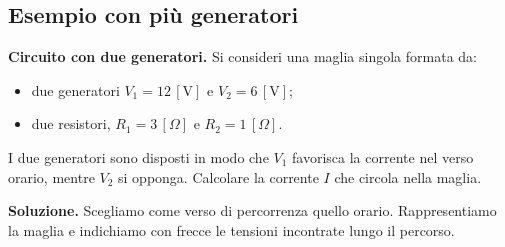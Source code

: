 \subsection{Esempio con più generatori}

\begin{esempio}
\textbf{Circuito con due generatori.} Si consideri una maglia singola formata da:
\begin{itemize}[leftmargin=1cm]
  \item due generatori \(V_1 = 12\,[\text{V}]\) e \(V_2 = 6\,[\text{V}]\);
  \item due resistori, \(R_1 = 3\,[\Omega]\) e \(R_2 = 1\,[\Omega]\).
\end{itemize}
I due generatori sono disposti in modo che \(V_1\) favorisca la corrente nel verso orario, mentre \(V_2\) si opponga. Calcolare la corrente \(I\) che circola nella maglia.

\smallskip
\textbf{Soluzione.} Scegliamo come verso di percorrenza quello orario. Rappresentiamo la maglia e indichiamo con frecce le tensioni incontrate lungo il percorso.



\begin{center}
\end{center}
\end{esempio}
